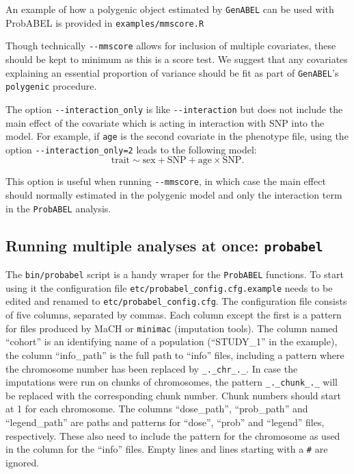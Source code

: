 \documentclass[12pt,a4paper]{article}
\newcommand{\PA}{\texttt{ProbABEL}}
\newcommand{\GA}{\texttt{GenABEL}}
\begin{document}
An example of how a polygenic object estimated by \GA{} can be used
with ProbABEL is provided in \texttt{examples/mmscore.R}

Though technically \lstinline{--mmscore} allows for inclusion of multiple
covariates, these should be kept to minimum as this is a score test. We
suggest that any covariates explaining an essential proportion of
variance should be fit as part of \GA{}'s
\texttt{polygenic} procedure.

The option \lstinline{--interaction_only} is like \lstinline{--interaction}
but does not include the main effect of the covariate which is acting
in interaction with SNP into the model. For example, if \texttt{age}
is the second covariate in the phenotype file, using the option
\lstinline{--interaction_only=2} leads to the following model:
\begin{equation*}
  \textrm{trait} \sim \textrm{sex} + \textrm{SNP} +
  \textrm{age} \times \mathrm{SNP}.
\end{equation*}

This option is useful when
running \lstinline{--mmscore}, in which case the main effect should
normally estimated in the polygenic model and only the interaction
term in the \PA{} analysis.

\subsection{Running multiple analyses at once: \texttt{probabel}}
The \texttt{bin/probabel} script is a handy wraper for the \PA{}
functions. To start using it the configuration file
\texttt{etc/probabel\_config.cfg.example} needs to be edited and
renamed to \texttt{etc/probabel\_config.cfg}. The configuration file
consists of five columns, separated by commas. Each column except the
first is a pattern for files produced by MaCH or \texttt{minimac}
(imputation tools). The column named ``cohort'' is an identifying name
of a population (``STUDY\_1'' in the example), the column
``info\_path'' is the full path to ``info'' files, including a pattern
where the chromosome number has been replaced by
\texttt{\_.\_chr\_.\_}. In case the imputations were run on chunks of
chromosomes, the pattern \texttt{\_.\_chunk\_.\_} will be replaced
with the corresponding chunk number. Chunk numbers should start at 1
for each chromosome. The columns ``dose\_path'', ``prob\_path'' and
``legend\_path'' are paths and patterns for ``dose'', ``prob'' and
``legend'' files, respectively. These also need to include the pattern
for the chromosome as used in the column for the ``info'' files.
Empty lines and lines starting with a \texttt{\#} are ignored.
\end{document}

